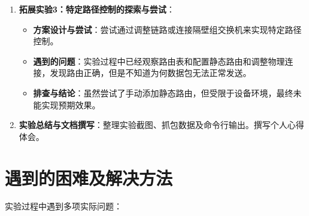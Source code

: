 \documentclass[a4paper]{article}
\begin{document}
\begin{enumerate}
    \item \textbf{拓展实验3：特定路径控制的探索与尝试}：
    \begin{itemize}
        \item \textbf{方案设计与尝试}：尝试通过调整链路或连接隔壁组交换机来实现特定路径控制。
        \item \textbf{遇到的问题}：实验过程中已经观察路由表和配置静态路由和调整物理连接，发现路由正确，但是不知道为何数据包无法正常发送。
        \item \textbf{排查与结论}：虽然尝试了手动添加静态路由，但受限于设备环境，最终未能实现预期效果。
    \end{itemize}

    \item \textbf{实验总结与文档撰写}：整理实验截图、抓包数据及命令行输出。撰写个人心得体会。
\end{enumerate}

\section{遇到的困难及解决方法}

实验过程中遇到多项实际问题：
\end{document}
